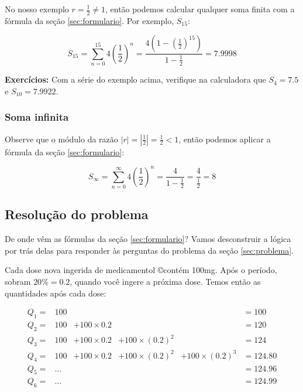 \documentclass[a4paper]{article}
\begin{document}
No nosso exemplo $r = \frac{1}{2} \ne 1$, então podemos calcular
qualquer soma finita com a fórmula da seção \ref{sec:formulario}. Por
exemplo, $S_{15}$:

\begin{displaymath}
  S_{15} = \sum_{n=0}^{15} 4\left(\frac{1}{2}\right)^n =
  \frac{4\left(1-\left(\frac{1}{2}\right)^{15}\right)}{1-\frac{1}{2}} = 7.9998
\end{displaymath}

{\bf Exercícios:} Com a série do exemplo acima, verifique na
calculadora que $S_4=7.5$ e $S_{10}=7.9922$.

\subsubsection{Soma infinita}

Observe que o módulo da razão
$|r|=\left|\frac{1}{2}\right|=\frac{1}{2} <1$, então podemos aplicar a
fórmula da seção \ref{sec:formulario}:

\begin{displaymath}
  S_\infty = \sum_{n=0}^\infty 4\left(\frac{1}{2}\right)^n =
  \frac{4}{1-\frac{1}{2}} = \frac{4}{\frac{1}{2}} = 8
\end{displaymath}

\subsection{Resolução do problema}

De onde vêm as fórmulas da seção \ref{sec:formulario}? Vamos
desconstruir a lógica por trás delas para responder às perguntas do
problema da seção \ref{sec:problema}.

Cada dose nova ingerida de medicamentol \copyright contém 100mg. Após
o período, sobram $20\%=0.2$, quando você ingere a próxima dose. Temos
então as quantidades após cada dose:

\begin{displaymath}
  \begin{array}{cccccl}
    Q_1=&100&&&&=100 \\
    Q_2=&100&+100\times 0.2&&&=120 \\
    Q_3=&100&+100\times 0.2&+100\times (0.2)^2&&=124\\
    Q_4=&100&+100\times 0.2&+100\times (0.2)^2&+100\times(0.2)^3&=124.80 \\
    Q_5=&\ldots &&&&=124.96\\
    Q_6=&\ldots&&&&=124.99
  \end{array}
\end{displaymath}
\end{document}
